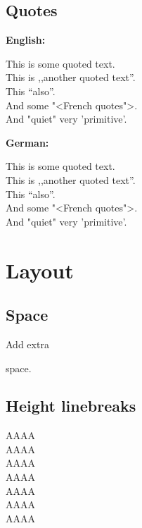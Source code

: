 \documentclass[a4paper, 11pt]{article}
\begin{document}
		\subsection{Quotes}
			\textbf{English:}\\
			\begin{otherlanguage}{english}
				This is \glqq some quoted text\grqq. \\
				This is ,,another quoted text''. \\
				This "`also"'. \\
				And some "<French quotes">. \\
				And "quiet" very 'primitive'.
			\end{otherlanguage}

			\vspace{\baselineskip}			
			\textbf{German:}\\
			\begin{otherlanguage}{ngerman}
				This is \glqq some quoted text\grqq. \\
				This is ,,another quoted text''. \\
				This "`also"'. \\
				And some "<French quotes">. \\
				And "quiet" very 'primitive'.
			\end{otherlanguage}
	    
	    
	\section{Layout}\label{sec:layout}
		\subsection{Space}
			Add extra
			
			\vspace{2\baselineskip}
			
			space.
			
		\subsection{Height linebreaks}
			AAAA \\
			AAAA \\[.1ex]
			AAAA \\[1ex]			
			AAAA \\[2ex]			
			AAAA \\[5ex]				
			AAAA \\[1.5cm]		
			AAAA
\end{document}
